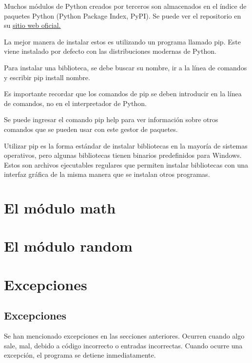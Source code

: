 \documentclass{report}
\begin{document}
Muchos módulos de Python creados por terceros son almacenados en el índice de paquetes Python (Python Package Index, PyPI). Se puede ver el repositorio en su \href{https://pypi.org}{\underline{sitio web oficial.}}

La mejor manera de instalar estos es utilizando un programa llamado pip. Este viene instalado por defecto con las distribuciones modernas de Python.

Para instalar una biblioteca, se debe buscar su nombre, ir a la línea de comandos y escribir pip install nombre.


Es importante recordar que los comandos de pip se deben introducir en la línea de comandos, no en el interpretador de Python.

Se puede ingresar el comando pip help para ver información sobre otros comandos que se pueden usar con este gestor de paquetes.


Utilizar pip es la forma estándar de instalar bibliotecas en la mayoría de sistemas operativos, pero algunas bibliotecas tienen binarios predefinidos para Windows. Estos son archivos ejecutables regulares que permiten instalar bibliotecas con una interfaz gráfica de la misma manera que se instalan otros programas.

\clearpage\chapter{El módulo math}

\clearpage\chapter{El módulo random}

\clearpage\chapter{Excepciones}

\section{Excepciones}

Se han mencionado excepciones en las secciones anteriores. Ocurren cuando algo sale, mal, debido a código incorrecto o entradas incorrectas. Cuando ocurre una excepción, el programa se detiene inmediatamente.
\end{document}
